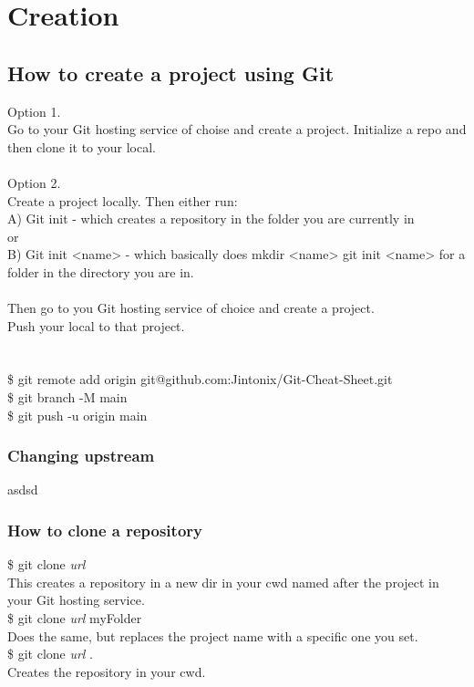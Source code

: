 \chapter{Creation}

\section{How to create a project using Git}
Option 1.\\
Go to your Git hosting service of choise and create a project. Initialize a repo and then clone it to your local.
\\\\
Option 2.\\
Create a project locally. Then either run:\\
A) Git init - which creates a repository in the folder you are currently in\\
or\\
B) Git init <name> - which basically does mkdir <name> git init <name> for a folder in the directory you are in.\\
\\
Then go to you Git hosting service of choice and create a project.\\
Push your local to that project.\\
\\\\
\$ git remote add origin git@github.com:Jintonix/Git-Cheat-Sheet.git \\
\$ git branch -M main\\
\$ git push -u origin main\\

\subsection{Changing upstream}
asdsd

\subsection{How to clone a repository}
\$ git clone \textit{url}\\
This creates a repository in a new dir in your cwd named after the project in your Git hosting service.\\
\$ git clone \textit{url} myFolder\\
Does the same, but replaces the project name with a specific one you set.\\
\$ git clone \textit{url} .\\
Creates the repository in your cwd.